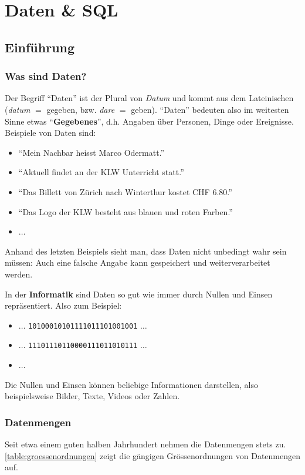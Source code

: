 \chapter{Daten \& SQL}\label{ch:Lektion}
\section{Einführung}

\subsection{Was sind Daten?}

Der Begriff \enquote{Daten} ist der Plural von \textit{Datum} und kommt aus dem Lateinischen (\textit{datum} $=$ gegeben,
bzw. \textit{dare} $=$ geben). \enquote{Daten} bedeuten also im weitesten Sinne etwas \enquote{\textbf{Gegebenes}}, d.h. Angaben über Personen, Dinge oder Ereignisse. Beispiele von Daten sind:
\begin{itemize}
  \item \enquote{Mein Nachbar heisst Marco Odermatt.}
  \item \enquote{Aktuell findet an der KLW Unterricht statt.}
  \item \enquote{Das Billett von Zürich nach Winterthur kostet CHF 6.80.}
  \item \enquote{Das Logo der KLW besteht aus blauen und roten Farben.}
  \item $\ldots$
\end{itemize}
Anhand des letzten Beispiels sieht man, dass Daten nicht unbedingt wahr sein müssen: Auch eine falsche Angabe kann gespeichert und weiterverarbeitet werden.

In der \textbf{Informatik} sind Daten so gut wie immer durch Nullen und Einsen repräsentiert. Also zum Beispiel:
\begin{itemize}
  \item $\ldots$ \verb|10100010101111011101001001| $\ldots$
  \item $\ldots$ \verb|11101110110000111011010111| $\ldots$
  \item $\ldots$
\end{itemize}
Die Nullen und Einsen können beliebige Informationen darstellen, also beispielsweise Bilder, Texte, Videos oder Zahlen.

\subsection{Datenmengen}
Seit etwa einem guten halben Jahrhundert nehmen die Datenmengen stets zu. \cref{table:groessenordnungen} zeigt die gängigen Grössenordnungen von Datenmengen auf.


